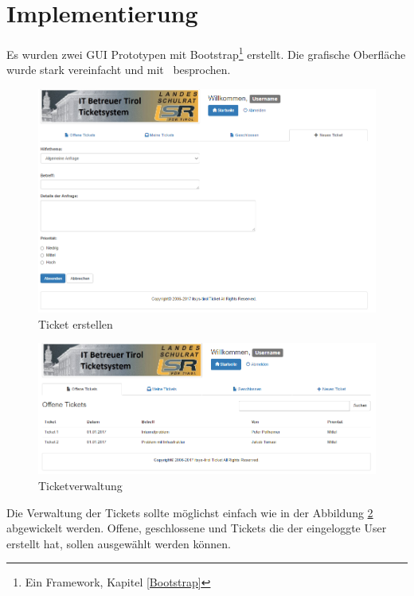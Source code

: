 	\section{Implementierung}
	Es wurden zwei GUI Prototypen mit Bootstrap\footnote{Ein Framework,  Kapitel \ref{Bootstrap}}  erstellt. Die grafische Oberfläche wurde stark vereinfacht und mit \getHammerl\ besprochen.
	\begin{figure}[h]
		\centering
		\includegraphics[scale=0.6]{figures/newTicket.png}
		\caption{Ticket erstellen}
		\label{Ein Ticket erstellen}
	\end{figure}
	\newpage
	\begin{figure}[h]
		\centering
		\includegraphics[scale=0.68]{figures/index.png}
		\caption{Ticketverwaltung}
		\label{Tickets verwalten}
	\end{figure}
Die Verwaltung der Tickets sollte möglichst einfach wie in der Abbildung \ref{Tickets verwalten} abgewickelt werden. Offene, geschlossene und Tickets die der eingeloggte User erstellt hat, sollen ausgewählt werden können.